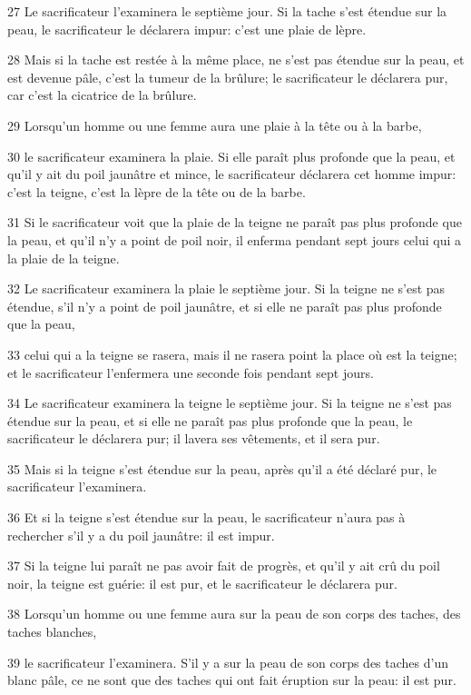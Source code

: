 \par 27 Le sacrificateur l'examinera le septième jour. Si la tache s'est étendue sur la peau, le sacrificateur le déclarera impur: c'est une plaie de lèpre.
\par 28 Mais si la tache est restée à la même place, ne s'est pas étendue sur la peau, et est devenue pâle, c'est la tumeur de la brûlure; le sacrificateur le déclarera pur, car c'est la cicatrice de la brûlure.
\par 29 Lorsqu'un homme ou une femme aura une plaie à la tête ou à la barbe,
\par 30 le sacrificateur examinera la plaie. Si elle paraît plus profonde que la peau, et qu'il y ait du poil jaunâtre et mince, le sacrificateur déclarera cet homme impur: c'est la teigne, c'est la lèpre de la tête ou de la barbe.
\par 31 Si le sacrificateur voit que la plaie de la teigne ne paraît pas plus profonde que la peau, et qu'il n'y a point de poil noir, il enferma pendant sept jours celui qui a la plaie de la teigne.
\par 32 Le sacrificateur examinera la plaie le septième jour. Si la teigne ne s'est pas étendue, s'il n'y a point de poil jaunâtre, et si elle ne paraît pas plus profonde que la peau,
\par 33 celui qui a la teigne se rasera, mais il ne rasera point la place où est la teigne; et le sacrificateur l'enfermera une seconde fois pendant sept jours.
\par 34 Le sacrificateur examinera la teigne le septième jour. Si la teigne ne s'est pas étendue sur la peau, et si elle ne paraît pas plus profonde que la peau, le sacrificateur le déclarera pur; il lavera ses vêtements, et il sera pur.
\par 35 Mais si la teigne s'est étendue sur la peau, après qu'il a été déclaré pur, le sacrificateur l'examinera.
\par 36 Et si la teigne s'est étendue sur la peau, le sacrificateur n'aura pas à rechercher s'il y a du poil jaunâtre: il est impur.
\par 37 Si la teigne lui paraît ne pas avoir fait de progrès, et qu'il y ait crû du poil noir, la teigne est guérie: il est pur, et le sacrificateur le déclarera pur.
\par 38 Lorsqu'un homme ou une femme aura sur la peau de son corps des taches, des taches blanches,
\par 39 le sacrificateur l'examinera. S'il y a sur la peau de son corps des taches d'un blanc pâle, ce ne sont que des taches qui ont fait éruption sur la peau: il est pur.

